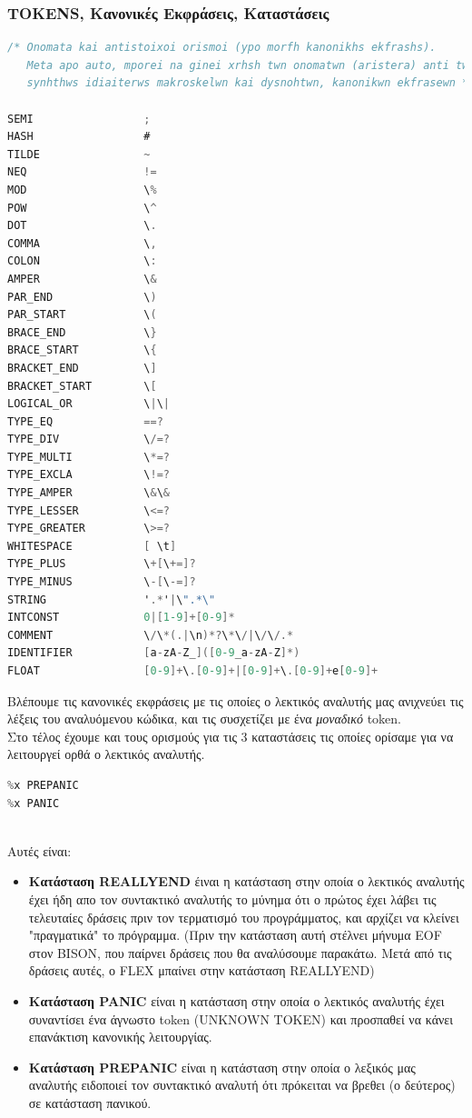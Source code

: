 \documentclass[14pt]{extarticle}
\begin{document}
\subsubsection{TOKENS, Kανονικές Eκφράσεις, Καταστάσεις}
\begin{lstlisting}[language=C]
/* Onomata kai antistoixoi orismoi (ypo morfh kanonikhs ekfrashs).
   Meta apo auto, mporei na ginei xrhsh twn onomatwn (aristera) anti twn,
   synhthws idiaiterws makroskelwn kai dysnohtwn, kanonikwn ekfrasewn */

SEMI                 ;
HASH                 #
TILDE                ~
NEQ                  !=
MOD                  \%
POW                  \^
DOT                  \.
COMMA                \,
COLON                \:
AMPER                \&
PAR_END              \)
PAR_START            \(
BRACE_END            \}
BRACE_START          \{
BRACKET_END          \]
BRACKET_START        \[
LOGICAL_OR           \|\|
TYPE_EQ              ==?
TYPE_DIV             \/=?
TYPE_MULTI           \*=?
TYPE_EXCLA           \!=?
TYPE_AMPER           \&\&
TYPE_LESSER          \<=?
TYPE_GREATER         \>=?
WHITESPACE           [ \t]
TYPE_PLUS            \+[\+=]?
TYPE_MINUS           \-[\-=]?
STRING               '.*'|\".*\"
INTCONST             0|[1-9]+[0-9]*
COMMENT              \/\*(.|\n)*?\*\/|\/\/.*
IDENTIFIER           [a-zA-Z_]([0-9_a-zA-Z]*)
FLOAT                [0-9]+\.[0-9]+|[0-9]+\.[0-9]+e[0-9]+
\end{lstlisting}
Βλέπουμε τις κανονικές εκφράσεις με τις οποίες ο λεκτικός αναλυτής μας
ανιχνεύει τις λέξεις του αναλυόμενου κώδικα, και τις συσχετίζει με ένα \emph{μοναδικό} token.
\\
Στο τέλος έχουμε και τους ορισμούς για τις 3 καταστάσεις τις οποίες ορίσαμε για να λειτουργεί ορθά
ο λεκτικός αναλυτής.
\begin{lstlisting}[language=C]
%x REALLYEND
%x PREPANIC
%x PANIC
\end{lstlisting}
\\
Αυτές είναι:
\begin{itemize}
    \item \textbf{Κατάσταση REALLYEND} έιναι η κατάσταση στην οποία ο λεκτικός
        αναλυτής έχει ήδη απο τον συντακτικό αναλυτής το μύνημα ότι ο πρώτος έχει
        λάβει τις τελευταίες δράσεις πριν τον τερματισμό του προγράμματος, και
        αρχίζει να κλείνει "πραγματικά" το πρόγραμμα. (Πριν την κατάσταση αυτή
        στέλνει μήνυμα EOF στον BISON, που παίρνει δράσεις που θα αναλύσουμε
        παρακάτω. Μετά από τις δράσεις αυτές, ο FLEX μπαίνει στην κατάσταση REALLYEND)
    \item \textbf{Κατάσταση PANIC} είναι η κατάσταση στην οποία ο λεκτικός αναλυτής
        έχει συναντίσει ένα άγνωστο token (UNKNOWN TOKEN) και προσπαθεί να κάνει
        επανάκτιση κανονικής λειτουργίας.
    \item \textbf{Κατάσταση PREPANIC} είναι η κατάσταση στην οποία ο λεξικός
        μας αναλυτής ειδοποιεί τον συντακτικό αναλυτή ότι πρόκειται να βρεθει
        (ο δεύτερος) σε κατάσταση πανικού.
\end{itemize}
\clearpage
\end{document}
